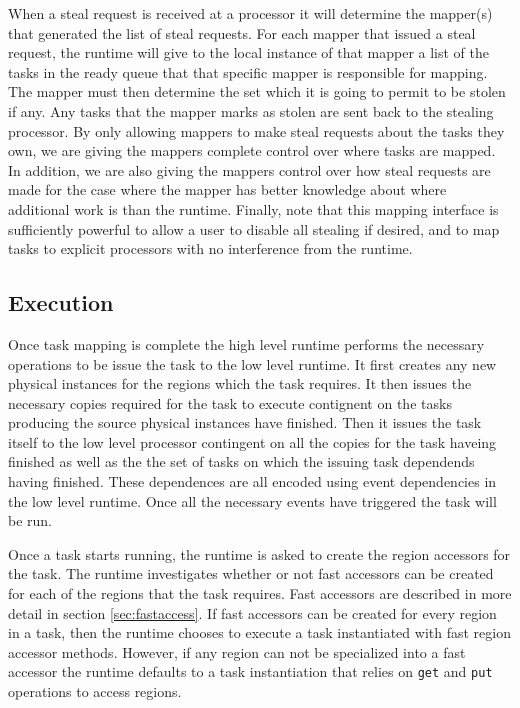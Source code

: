 When a steal request is received at a processor it will determine the mapper(s) that generated
the list of steal requests.  For each mapper that issued a steal request, the runtime will
give to the local instance of that mapper a list of the tasks in the ready queue that that
specific mapper is responsible for mapping.  The mapper must then determine the set which
it is going to permit to be stolen if any.  Any tasks that the mapper marks as stolen are
sent back to the stealing processor.  By only allowing mappers to make steal requests about
the tasks they own, we are giving the mappers complete control over where tasks are mapped.
In addition, we are also giving the mappers control over how steal requests are made for
the case where the mapper has better knowledge about where additional work is than the 
runtime.  Finally, note that this mapping interface is sufficiently powerful to allow a user to
disable all stealing if desired, and to map tasks to explicit processors with no interference
from the runtime.

\subsection{Execution}
\label{subsec:execution}
Once task mapping is complete the high level runtime performs the necessary operations
to be issue the task to the low level runtime.  It first creates any new physical instances
for the regions which the task requires.  It then issues the necessary copies required
for the task to execute contignent on the tasks producing the source physical instances
have finished.  Then it issues the task itself to the low level processor contingent
on all the copies for the task haveing finished as well as the the set of tasks
on which the issuing task dependends having finished.  These dependences are all encoded
using event dependencies in the low level runtime.  Once all the necessary events
have triggered the task will be run.

Once a task starts running, the runtime is asked to create the region accessors for
the task.  The runtime investigates whether or not fast accessors can be created for
each of the regions that the task requires.  Fast accessors are described in more
detail in section \ref{sec:fastaccess}.  If fast accessors can be created for every
region in a task, then the runtime chooses to execute a task instantiated with fast
region accessor methods.  However, if any region can not be specialized into a fast
accessor the runtime defaults to a task instantiation that relies on {\tt get} and
{\tt put} operations to access regions.

